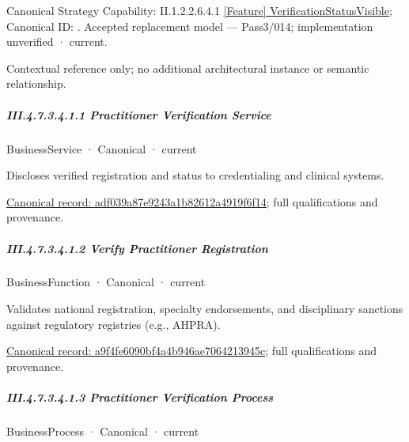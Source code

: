 {\small Canonical Strategy Capability: II.1.2.2.6.4.1 \hyperref[element:2275144b93364b2ca3f2368b69e1ce80]{[Feature] VerificationStatusVisible}; Canonical ID: \texttt{}. Accepted replacement model — Pass3/014; implementation unverified · current.}\par
Contextual reference only; no additional architectural instance or semantic relationship.\par
\subparagraph*{III.4.7.3.4.1.1 Practitioner Verification Service}
\label{navigation:III.4.7.3.4.1.1}

\label{element:adf039a87e9243a1b82612a4919f6f14}
{\small BusinessService · Canonical · current}\par

Discloses verified registration and status to credentialing and clinical systems.


{\footnotesize \href{../../../../../../../../continuum/business/business-service/adf039a87e9243a1b82612a4919f6f14.md}{Canonical record: adf039a87e9243a1b82612a4919f6f14}; full qualifications and provenance.}\par
\subparagraph*{III.4.7.3.4.1.2 Verify Practitioner Registration}
\label{navigation:III.4.7.3.4.1.2}

\label{element:a9f4fe6090bf4a4b946ae7064213945c}
{\small BusinessFunction · Canonical · current}\par

Validates national registration, specialty endorsements, and disciplinary sanctions against regulatory registries (e.g., AHPRA).


{\footnotesize \href{../../../../../../../../continuum/business/business-function/a9f4fe6090bf4a4b946ae7064213945c.md}{Canonical record: a9f4fe6090bf4a4b946ae7064213945c}; full qualifications and provenance.}\par
\subparagraph*{III.4.7.3.4.1.3 Practitioner Verification Process}
\label{navigation:III.4.7.3.4.1.3}

\label{element:32a3e1f948474d3aa77ca71bfa515f58}
{\small BusinessProcess · Canonical · current}\par

